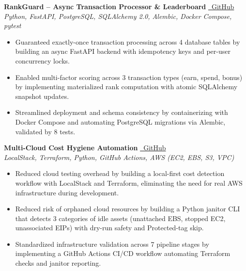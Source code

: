 \documentclass[10pt, letterpaper]{article}
\begin{document}
\noindent \textbf{RankGuard – Async Transaction Processor \& Leaderboard} \href{https://github.com/SoulByte07/RankGuard}{\faGithub\ GitHub} \\
\textit{Python, FastAPI, PostgreSQL, SQLAlchemy 2.0, Alembic, Docker Compose, pytest}
\begin{itemize}
    \item Guaranteed exactly-once transaction processing across 4 database tables by building an async FastAPI backend with idempotency keys and per-user concurrency locks.
    \item Enabled multi-factor scoring across 3 transaction types (earn, spend, bonus) by implementing materialized rank computation with atomic SQLAlchemy snapshot updates.
    \item Streamlined deployment and schema consistency by containerizing with Docker Compose and automating PostgreSQL migrations via Alembic, validated by 8 tests.
\end{itemize}




\vspace{6pt}
\noindent \textbf{Multi-Cloud Cost Hygiene Automation} \href{https://github.com/SoulByte07/Multi-Cloud-Cost-Hygiene-Automation}{\faGithub\ GitHub} \\
\textit{LocalStack, Terraform, Python, GitHub Actions, AWS (EC2, EBS, S3, VPC)}
\begin{itemize}
    \item Reduced cloud testing overhead by building a local-first cost detection workflow with LocalStack and Terraform, eliminating the need for real AWS infrastructure during development.
    \item Reduced risk of orphaned cloud resources by building a Python janitor CLI that detects 3 categories of idle assets (unattached EBS, stopped EC2, unassociated EIPs) with dry-run safety and Protected-tag skip.
    \item Standardized infrastructure validation across 7 pipeline stages by implementing a GitHub Actions CI/CD workflow automating Terraform checks and janitor reporting.
\end{itemize}

\vspace{6pt}
\end{document}
